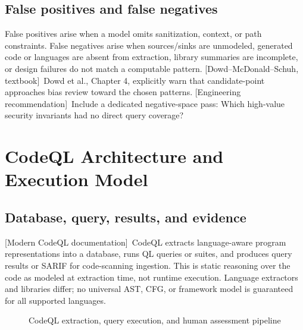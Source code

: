 \documentclass[11pt,letterpaper,oneside]{book}
\newcommand{\srcD}{\textsf{[Dowd--McDonald--Schuh, textbook]}}
\newcommand{\srcM}{\textsf{[Modern CodeQL documentation]}}
\newcommand{\srcR}{\textsf{[Engineering recommendation]}}
\begin{document}
\section{False positives and false negatives}

False positives arise when a model omits sanitization, context, or path constraints. False negatives arise when sources/sinks are unmodeled, generated code or languages are absent from extraction, library summaries are incomplete, or design failures do not match a computable pattern. \srcD\ Dowd et al., Chapter 4, explicitly warn that candidate-point approaches bias review toward the chosen patterns. \srcR\ Include a dedicated negative-space pass: Which high-value security invariants had no direct query coverage?

\chapter{CodeQL Architecture and Execution Model}

\section{Database, query, results, and evidence}

\srcM\ CodeQL extracts language-aware program representations into a database, runs QL queries or suites, and produces query results or SARIF for code-scanning ingestion. This is static reasoning over the code as modeled at extraction time, not runtime execution. Language extractors and libraries differ; no universal AST, CFG, or framework model is guaranteed for all supported languages.

\begin{figure}[htbp]\centering
{}
\caption{CodeQL extraction, query execution, and human assessment pipeline}\label{fig:pipeline}\end{figure}
\end{document}
